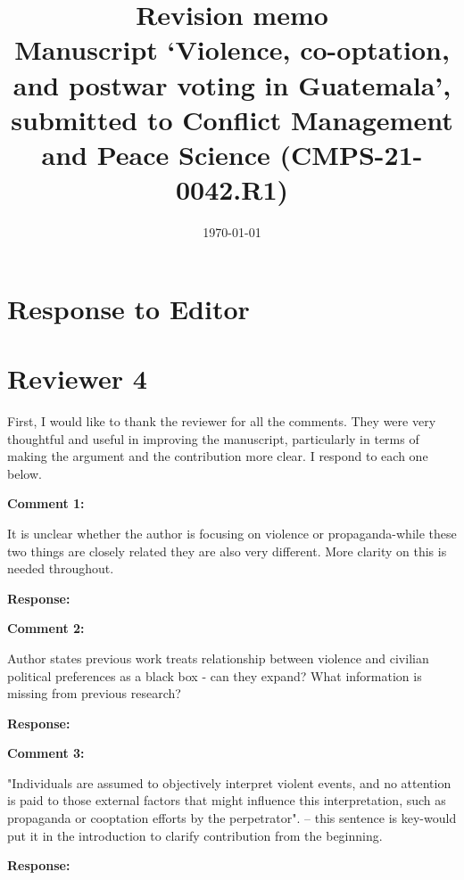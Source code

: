 \documentclass[12pt, a4paper, notitlepage]{article}
\title{\large \textbf{Revision memo}\\{\normalsize Manuscript `Violence, co-optation, and postwar voting in Guatemala', submitted to Conflict Management and Peace Science (CMPS-21-0042.R1)}}
\author{}
\date{\today}
\begin{document}
\maketitle

\section*{Response to Editor}

\newpage
\section*{Reviewer 4}

First, I would like to thank the reviewer for all the comments. They were very thoughtful and useful in improving the manuscript, particularly in terms of making the argument and the contribution more clear. I respond to each one below.

\vspace{15pt}
\noindent\textbf{Comment 1:}
\begin{displayquote}
It is unclear whether the author is focusing on violence or propaganda-while these two things are closely related they are also very different. More clarity on this is needed throughout.
\end{displayquote}

\noindent\textbf{Response:}


\vspace{15pt}
\noindent\textbf{Comment 2:}
\begin{displayquote}
Author states previous work treats relationship between violence and civilian political preferences as a black box - can they expand? What information is missing from previous research?
\end{displayquote}

\noindent\textbf{Response:}


\vspace{15pt}
\noindent\textbf{Comment 3:}
\begin{displayquote}
"Individuals are assumed to objectively interpret violent events, and no attention is paid to those external factors that might influence this interpretation, such as propaganda or cooptation efforts by the perpetrator". -- this sentence is key-would put it in the introduction to clarify contribution from the beginning.
\end{displayquote}

\noindent\textbf{Response:}
\end{document}
